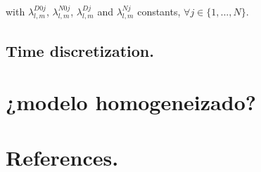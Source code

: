 \documentclass[]{article}%
\begin{document}
with $\lambda_{l,m}^{D0j}$, $\lambda_{l,m}^{N0j}$, $\lambda_{l,m}^{Dj}$ and $\lambda_{l,m}^{Nj}$ constants, $\forall j \in \{1, ..., N \}$.

\subsection{Time discretization.}

\section{¿modelo homogeneizado?}


\section{References.}


% 
%
\end{document}
